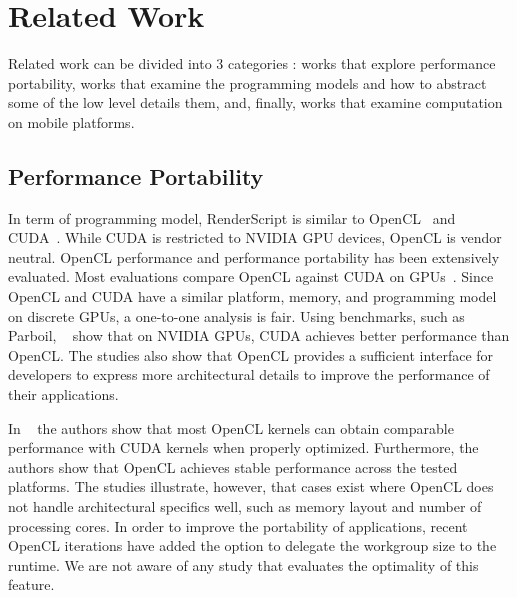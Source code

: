 \section{Related Work}
\label{sec:related}

Related work can be divided into $3$ categories : works that
explore performance portability, works that examine the
programming models and how to abstract some of the low level details them, and,
finally, works that examine computation on mobile platforms.

\subsection{Performance Portability}

In term of programming model, RenderScript is similar to OpenCL~\cite{OpenCL_kh}
and CUDA~\cite{CUDA:Programming-Guide}. While CUDA is restricted to NVIDIA GPU
devices, OpenCL is vendor neutral. OpenCL performance and performance
portability has been extensively evaluated.  Most evaluations compare OpenCL
against CUDA on GPUs~\cite{fang2011comprehensive, weber2011comparing,
van2011correlating, vassilev2010comparison, amorim2009comparing,
karimi2010performance, komatsu2010evaluating}.  Since OpenCL and CUDA have a
similar platform, memory, and programming model on discrete GPUs, a one-to-one
analysis is fair.  Using benchmarks, such as Parboil, ~\cite{weber2011comparing,
van2011correlating, vassilev2010comparison, amorim2009comparing} show that on
NVIDIA GPUs, CUDA achieves better performance than OpenCL.  The studies also
show that OpenCL provides a sufficient interface for developers to express more
architectural details to improve the performance of their applications. 

In ~\cite{komatsu2010evaluating,fang2011comprehensive,dolbeau2013one} the
authors show that most OpenCL kernels can obtain comparable performance with
CUDA kernels when properly optimized.  Furthermore, the authors show that OpenCL
achieves stable performance across the tested platforms. The studies illustrate,
however, that cases exist where OpenCL does not handle architectural specifics
well, such as memory layout and number of processing cores. In order to improve
the portability of applications, recent OpenCL iterations have added the option
to delegate the workgroup size to the runtime.  We are not aware of any study
that evaluates the optimality of this feature.


